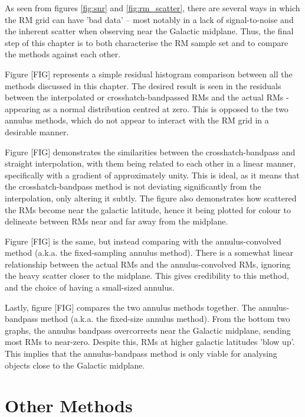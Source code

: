 As seen from figures \ref{fig:snr} and \ref{fig:rm_scatter}, there are several ways in which the RM grid can have 'bad data' – most notably in a lack of signal-to-noise and the inherent scatter when observing near the Galactic midplane. Thus, the final step of this chapter is to both characterise the RM sample set and to compare the methods against each other.


Figure [FIG] represents a simple residual histogram comparison between all the methods discussed in this chapter. The desired result is seen in the residuals between the interpolated or crosshatch-bandpassed RMs and the actual RMs - appearing as a normal distribution centred at zero.  This is opposed to the two annulus methods, which do not appear to interact with the RM grid in a desirable manner.


Figure [FIG] demonstrates the similarities between the crosshatch-bandpass and straight interpolation, with them being related to each other in a linear manner, specifically with a gradient of approximately unity. This is ideal, as it means that the crosshatch-bandpass method is not deviating significantly from the interpolation, only altering it subtly. The figure also demonstrates how scattered the RMs become near the galactic latitude, hence it being plotted for colour to delineate between RMs near and far away from the midplane.


Figure [FIG] is the same, but instead comparing with the annulus-convolved method (a.k.a. the fixed-sampling annulus method). There is a somewhat linear relationship between the actual RMs and the annulus-convolved RMs, ignoring the heavy scatter closer to the midplane. This gives credibility to this method, and the choice of having a small-sized annulus.


Lastly, figure [FIG] compares the two annulus methods together. The annulus-bandpass method (a.k.a. the fixed-size annulus method). From the bottom two graphs, the annulus bandpass overcorrects near the Galactic midplane, sending most RMs to near-zero. Despite this, RMs at higher galactic latitudes 'blow up'. This implies that the annulus-bandpass method is only viable for analysing objects close to the Galactic midplane. 

\section{Other Methods}
\label{sec:other_methods}

